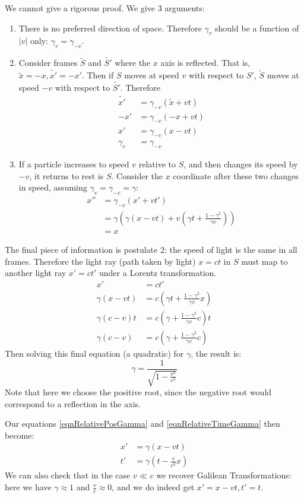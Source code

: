 \documentclass[../Main.tex]{subfiles}
\begin{document}
We cannot give a rigorous proof. We give 3 arguments:
\begin{enumerate}
    \item There is no preferred direction of space. Therefore $\gamma_v$ should be a function of $|v|$ only: $\gamma_v = \gamma_{-v}$.
    \item Consider frames $\tilde{S}$ and $\tilde{S'}$ where the $x$ axis is reflected. That is, $\tilde{x} = -x, \tilde{x'} = -x'$. Then if $S$ moves at speed $v$ with respect to $S'$, $\tilde{S}$ moves at speed $-v$ with respect to $\tilde{S'}$. Therefore
    \begin{align*}
        \tilde{x'} &= \gamma_{-v}(\tilde{x} + vt) \\
        -x' &= \gamma_{-v} (-x + vt) \\
        x' &= \gamma_{-v} (x - vt) \\
        \gamma_v &= \gamma_{-v}
    \end{align*}
    \item If a particle increases to speed $v$ relative to $S$, and then changes its speed by $-v$, it returns to rest is $S$. Consider the $x$ coordinate after these two changes in speed, assuming $\gamma_v = \gamma_{-v} = \gamma$:
        \begin{align*}
            x'' &= \gamma_{-v} (x' + vt') \\
            &= \gamma \left(\gamma (x - vt) + v\left(\gamma t + \frac{1 - \gamma^2}{\gamma v}\right)\right) \\
            &= x
        \end{align*}
\end{enumerate}
The final piece of information is postulate 2: the speed of light is the same in all frames. Therefore the light ray (path taken by light) $x = ct$ in $S$ must map to another light ray $x' = ct'$ under a Lorentz transformation.
\begin{align*}
    x' &= ct' \\
    \gamma (x - vt) &= c(\gamma t + \frac{1 - \gamma^2}{\gamma v}x) \\
    \gamma (c - v)t &= c(\gamma + \frac{1 - \gamma^2}{\gamma v}c)t \\
    \gamma (c - v) &= c(\gamma + \frac{1 - \gamma^2}{\gamma v}c)
\end{align*}
Then solving this final equation (a quadratic) for $\gamma$, the result is:
\begin{equation}
    \gamma = \frac{1}{\sqrt{1 - \frac{v^2}{c^2}}}
    \label{eqnLorentzFactor}
\end{equation}
Note that here we choose the positive root, since the negative root would correspond to a reflection in the axis.\par
Our equations \ref{eqnRelativePosGamma} and \ref{eqnRelativeTimeGamma} then become:
\begin{align}
    x' &= \gamma (x - vt) \label{eqnRelativePos} \\
    t' &= \gamma \left(t - \frac{v}{c^2}x\right) \label{eqnRelativeTime}
\end{align}
We can also check that in the case $v \ll c$ we recover Galilean Transformations: here we have $\gamma \approx 1$ and $\frac{v}{c} \approx 0$, and we do indeed get $x' = x - vt, t' = t$.
\end{document}

